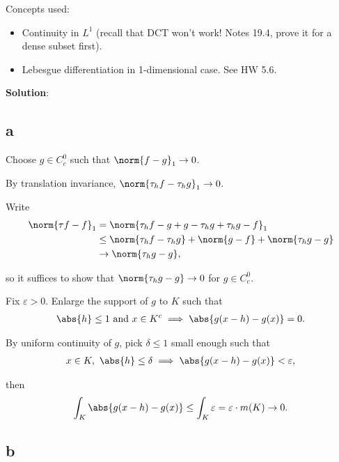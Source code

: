 \begin{solution}

Concepts used:

\begin{itemize}
\tightlist
\item
  Continuity in \(L^1\) (recall that DCT won't work! Notes 19.4, prove
  it for a dense subset first).
\item
  Lebesgue differentiation in 1-dimensional case. See HW 5.6.
\end{itemize}

\textbf{Solution}:

\hypertarget{a-14}{%
\subsection{a}\label{a-14}}

Choose \(g\in C_c^0\) such that \(\norm{f- g}_1 \to 0\).

By translation invariance, \(\norm{\tau_h f - \tau_h g}_1 \to 0\).

Write \begin{align*}
\norm{\tau f - f}_1 
&= \norm{\tau_h f - g + g - \tau_h g + \tau_h g - f}_1 \\
&\leq \norm{\tau_h f - \tau_h g} + \norm{g - f} + \norm{\tau_h g - g} \\
&\to \norm{\tau_h g - g}
,\end{align*}

so it suffices to show that \(\norm{\tau_h g - g} \to 0\) for
\(g\in C_c^0\).

Fix \(\varepsilon > 0\). Enlarge the support of \(g\) to \(K\) such that
\begin{align*}
\abs{h} \leq 1 \text{ and } x \in K^c \implies \abs{g(x-h) - g(x)} = 0
.\end{align*}

By uniform continuity of \(g\), pick \(\delta \leq 1\) small enough such
that
\begin{align*}
x\in K, ~\abs{h} \leq \delta \implies \abs{g(x-h) -g(x)} < \varepsilon
,\end{align*}

then
\begin{align*}
\int_K \abs{g(x-h) - g(x)} \leq \int_K \varepsilon = \varepsilon \cdot m(K) \to 0.
\end{align*}

\hypertarget{b-14}{%
\subsection{b}\label{b-14}}


\end{solution}
